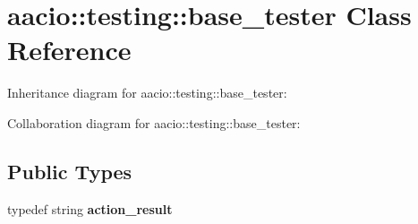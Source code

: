 \hypertarget{classaacio_1_1testing_1_1base__tester}{}\section{aacio\+:\+:testing\+:\+:base\+\_\+tester Class Reference}
\label{classaacio_1_1testing_1_1base__tester}


Inheritance diagram for aacio\+:\+:testing\+:\+:base\+\_\+tester\+:


Collaboration diagram for aacio\+:\+:testing\+:\+:base\+\_\+tester\+:
\subsection*{Public Types}
\begin{DoxyCompactItemize}
\item 
\mbox{\label{classaacio_1_1testing_1_1base__tester_a4cebc07a17a0752f33b4d07a56fefda7}} 
typedef string {\bfseries action\+\_\+result}
\end{DoxyCompactItemize}
